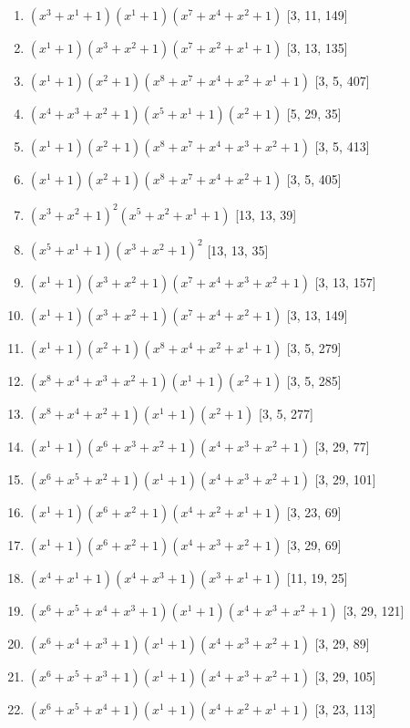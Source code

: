 \documentclass[10pt,twocolumn]{article}
\begin{document}
\begin{enumerate}
\item $(x^{3} + x^{1} + 1)(x^{1} + 1)(x^{7} + x^{4} + x^{2} + 1)$  [3, 11, 149]
\item $(x^{1} + 1)(x^{3} + x^{2} + 1)(x^{7} + x^{2} + x^{1} + 1)$  [3, 13, 135]
\item $(x^{1} + 1)(x^{2} + 1)(x^{8} + x^{7} + x^{4} + x^{2} + x^{1} + 1)$  [3, 5, 407]
\item $(x^{4} + x^{3} + x^{2} + 1)(x^{5} + x^{1} + 1)(x^{2} + 1)$  [5, 29, 35]
\item $(x^{1} + 1)(x^{2} + 1)(x^{8} + x^{7} + x^{4} + x^{3} + x^{2} + 1)$  [3, 5, 413]
\item $(x^{1} + 1)(x^{2} + 1)(x^{8} + x^{7} + x^{4} + x^{2} + 1)$  [3, 5, 405]
\item $(x^{3} + x^{2} + 1)^{2}(x^{5} + x^{2} + x^{1} + 1)$  [13, 13, 39]
\item $(x^{5} + x^{1} + 1)(x^{3} + x^{2} + 1)^{2}$  [13, 13, 35]
\item $(x^{1} + 1)(x^{3} + x^{2} + 1)(x^{7} + x^{4} + x^{3} + x^{2} + 1)$  [3, 13, 157]
\item $(x^{1} + 1)(x^{3} + x^{2} + 1)(x^{7} + x^{4} + x^{2} + 1)$  [3, 13, 149]
\item $(x^{1} + 1)(x^{2} + 1)(x^{8} + x^{4} + x^{2} + x^{1} + 1)$  [3, 5, 279]
\item $(x^{8} + x^{4} + x^{3} + x^{2} + 1)(x^{1} + 1)(x^{2} + 1)$  [3, 5, 285]
\item $(x^{8} + x^{4} + x^{2} + 1)(x^{1} + 1)(x^{2} + 1)$  [3, 5, 277]
\item $(x^{1} + 1)(x^{6} + x^{3} + x^{2} + 1)(x^{4} + x^{3} + x^{2} + 1)$  [3, 29, 77]
\item $(x^{6} + x^{5} + x^{2} + 1)(x^{1} + 1)(x^{4} + x^{3} + x^{2} + 1)$  [3, 29, 101]
\item $(x^{1} + 1)(x^{6} + x^{2} + 1)(x^{4} + x^{2} + x^{1} + 1)$  [3, 23, 69]
\item $(x^{1} + 1)(x^{6} + x^{2} + 1)(x^{4} + x^{3} + x^{2} + 1)$  [3, 29, 69]
\item $(x^{4} + x^{1} + 1)(x^{4} + x^{3} + 1)(x^{3} + x^{1} + 1)$  [11, 19, 25]
\item $(x^{6} + x^{5} + x^{4} + x^{3} + 1)(x^{1} + 1)(x^{4} + x^{3} + x^{2} + 1)$  [3, 29, 121]
\item $(x^{6} + x^{4} + x^{3} + 1)(x^{1} + 1)(x^{4} + x^{3} + x^{2} + 1)$  [3, 29, 89]
\item $(x^{6} + x^{5} + x^{3} + 1)(x^{1} + 1)(x^{4} + x^{3} + x^{2} + 1)$  [3, 29, 105]
\item $(x^{6} + x^{5} + x^{4} + 1)(x^{1} + 1)(x^{4} + x^{2} + x^{1} + 1)$  [3, 23, 113]

\end{enumerate}
\end{document}

